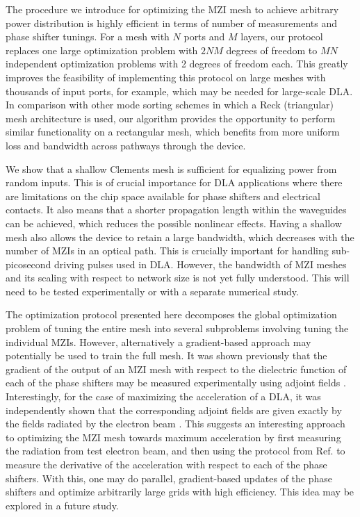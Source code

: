 The procedure we introduce for optimizing the MZI mesh to achieve arbitrary power distribution is highly efficient in terms of number of measurements and phase shifter tunings.  For a mesh with $N$ ports and $M$ layers, our protocol replaces one large optimization problem with $2NM$ degrees of freedom to $MN$ independent optimization problems with 2 degrees of freedom each.  This greatly improves the feasibility of implementing this protocol on large meshes with thousands of input ports, for example, which may be needed for large-scale DLA.  In comparison with other mode sorting schemes \cite{annoni_unscrambling_2017, miller_self-aligning_2013} in which a Reck (triangular) mesh architecture is used, our algorithm provides the opportunity to perform similar functionality on a rectangular mesh, which benefits from more uniform loss and bandwidth across pathways through the device.

We show that a shallow Clements mesh is sufficient for equalizing power from random inputs.  This is of crucial importance for DLA applications where there are limitations on the chip space available for phase shifters and electrical contacts.  It also means that a shorter propagation length within the waveguides can be achieved, which reduces the possible nonlinear effects.  Having a shallow mesh also allows the device to retain a large bandwidth, which decreases with the number of MZIs in an optical path.  This is crucially important for handling sub-picosecond driving pulses used in DLA.  However, the bandwidth of MZI meshes and its scaling with respect to network size is not yet fully understood.  This will need to be tested experimentally or with a separate numerical study.

The optimization protocol presented here decomposes the global optimization problem of tuning the entire mesh into several subproblems involving tuning the individual MZIs.  However, alternatively a gradient-based approach may potentially be used to train the full mesh.  It was shown previously \cite{hughes2018training} that the gradient of the output of an MZI mesh with respect to the dielectric function of each of the phase shifters may be measured experimentally using adjoint fields \cite{veronis_method_2004}. Interestingly, for the case of maximizing the acceleration of a DLA, it was independently shown that the corresponding adjoint fields are given exactly by the fields radiated by the electron beam \cite{hughes_method_2017}.  This suggests an interesting approach to optimizing the MZI mesh towards maximum acceleration by first measuring the radiation from test electron beam, and then using the protocol from Ref. \cite{hughes2018training} to measure the derivative of the acceleration with respect to each of the phase shifters.  With this, one may do parallel, gradient-based updates of the phase shifters and optimize arbitrarily large grids with high efficiency. This idea may be explored in a future study.

